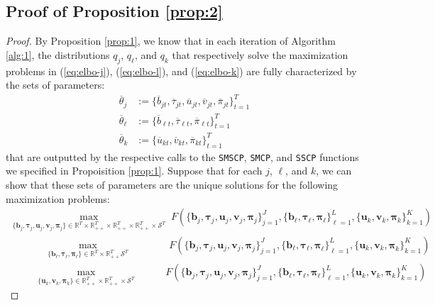 \subsection{Proof of Proposition \ref{prop:2}}
\label{app:prop2-proof}

\begin{proof}
By Proposition \ref{prop:1}, we know that in each iteration of Algorithm \ref{alg:1}, the distributions $q_j$, $q_\ell$, and $q_k$ that respectively solve the maximization problems in (\ref{eq:elbo-j}), (\ref{eq:elbo-l}), and (\ref{eq:elbo-k}) are fully characterized by the sets of parameters:
\begin{align*}
    \overline{\theta}_j &:= \{\overline{b}_{jt}, \overline{\tau}_{jt}, \overline{u}_{jt}, \overline{v}_{jt}, \overline{\pi}_{jt}\}_{t=1}^T \\
    \overline{\theta}_\ell &:= \{\overline{b}_{\ell t}, \overline{\tau}_{\ell t}, \overline{\pi}_{\ell t}\}_{t=1}^T\\
    \overline{\theta}_k &:= \{\overline{u}_{kt}, \overline{v}_{kt}, \overline{\pi}_{kt}\}_{t=1}^T
\end{align*} 
that are outputted by the respective calls to the \texttt{SMSCP}, \texttt{SMCP}, and \texttt{SSCP} functions we specified in Propoisition \ref{prop:1}. Suppose that for each $j$, $\ell$, and $k$, we can show that these sets of parameters are the unique solutions for the following maximization problems: 
\begin{gather*}
    \max_{\{\mathbf{b}_j, \pmb{\tau}_j, \mathbf{u}_j, \mathbf{v}_j, \pmb{\pi}_j\} \in \mathbb{R}^T\times\mathbb{R}_{++}^T\times\mathbb{R}_{++}^T\times\mathbb{R}_{++}^T \times\mathcal{S}^T} \; F(\{\mathbf{b}_j, \pmb{\tau}_j, \mathbf{u}_j, \mathbf{v}_j, \pmb{\pi}_j\}_{j=1}^J, \{\mathbf{b}_\ell, \pmb{\tau}_\ell, \pmb{\pi}_\ell\}_{\ell=1}^L, \{\mathbf{u}_k, \mathbf{v}_k, \pmb{\pi}_k\}_{k=1}^K) \\
    \;\;\quad\quad\quad\max_{\{\mathbf{b}_\ell, \pmb{\tau}_\ell, \pmb{\pi}_\ell\} \in \mathbb{R}^T\times\mathbb{R}_{++}^T\mathcal{S}^T} \;\quad\quad\quad\;\; F(\{\mathbf{b}_j, \pmb{\tau}_j, \mathbf{u}_j, \mathbf{v}_j, \pmb{\pi}_j\}_{j=1}^J, \{\mathbf{b}_\ell, \pmb{\tau}_\ell, \pmb{\pi}_\ell\}_{\ell=1}^L, \{\mathbf{u}_k, \mathbf{v}_k, \pmb{\pi}_k\}_{k=1}^K) \\
    \;\;\quad\quad\max_{\{\mathbf{u}_k, \mathbf{v}_k, \pmb{\pi}_k\} \in \mathbb{R}_{++}^T\times\mathbb{R}_{++}^T \times\mathcal{S}^T} \;\quad\quad\;\; F(\{\mathbf{b}_j, \pmb{\tau}_j, \mathbf{u}_j, \mathbf{v}_j, \pmb{\pi}_j\}_{j=1}^J, \{\mathbf{b}_\ell, \pmb{\tau}_\ell, \pmb{\pi}_\ell\}_{\ell=1}^L, \{\mathbf{u}_k, \mathbf{v}_k, \pmb{\pi}_k\}_{k=1}^K) 

\end{gather*}
\end{proof}

